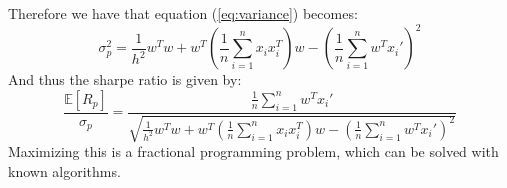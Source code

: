 \documentclass[12pt]{article}
\begin{document}
Therefore we have that equation (\ref{eq:variance}) becomes:
\begin{equation}
    \sigma_p^2 =\frac{1}{h^2}w^Tw + w^T\left(\frac{1}{n}\sum_{i=1}^nx_ix_i^T\right)w-\left(\frac{1}{n} \sum_{i=1}^nw^T x_i'\right)^2
\end{equation}
And thus the sharpe ratio is given by:
\begin{equation}
    \frac{\mathbb{E}[R_p]}{\sigma_p} = \frac{\frac{1}{n} \sum_{i=1}^nw^T x_i'}{\sqrt{\frac{1}{h^2}w^Tw + w^T\left(\frac{1}{n}\sum_{i=1}^nx_ix_i^T\right)w-\left(\frac{1}{n} \sum_{i=1}^nw^T x_i'\right)^2}}
\end{equation}
Maximizing this is a fractional programming problem, which can  be solved with known algorithms.
\end{document}
